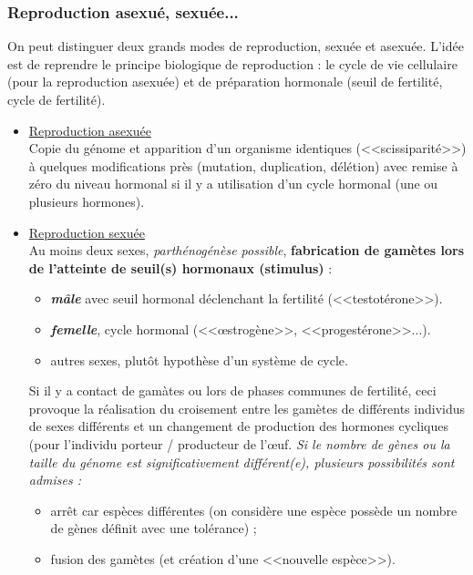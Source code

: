 \documentclass[11pt,twoside,a4paper]{article}
\begin{document}
\clearpage

\subsubsection{Reproduction asexu{\'e}, sexu{\'e}e...}

On peut distinguer deux grands modes de reproduction, sexu{\'e}e et asexu{\'e}e. L'id{\'e}e est de reprendre le principe biologique de reproduction : le cycle de vie cellulaire (pour la reproduction asexu{\'e}e) et de pr{\'e}paration hormonale (seuil de fertilit{\'e}, cycle de fertilit{\'e}).
\begin{itemize}
	\item \underline{Reproduction asexu{\'e}e}~\\
		Copie du g{\'e}nome et apparition d'un organisme identiques (<<scissiparit{\'e}>>) {\`a} quelques modifications pr{\`e}s (mutation, duplication, d{\'e}l{\'e}tion) avec remise {\`a} z{\'e}ro du niveau hormonal si il y a utilisation d'un cycle hormonal (une ou plusieurs hormones). 
	\item \underline{Reproduction sexu{\'e}e}~\\
		Au moins deux sexes, \emph{parth{\'e}nog{\'e}n{\`e}se possible}, \textbf{fabrication de gam{\`e}tes lors de l'atteinte de seuil(s) hormonaux (stimulus)} : 
		\begin{itemize}
			\item \textbf{\textit{m{\^a}le}} avec seuil hormonal d{\'e}clenchant la fertilit{\'e} (<<testot{\'e}rone>>).
			\item \textbf{\textit{femelle}}, cycle hormonal (<<\oe strog{\`e}ne>>, <<progest{\'e}rone>>...). 
			\item autres sexes, plut{\^o}t hypoth{\`e}se d'un syst{\`e}me de cycle. 
		\end{itemize}
		Si il y a contact de gam{\`a}tes ou lors de phases communes de fertilit{\'e}, ceci provoque la r{\'e}alisation du croisement entre les gam{\`e}tes de diff{\'e}rents individus de sexes diff{\'e}rents et un changement de production des hormones cycliques (pour l'individu porteur / producteur de l'\oe uf. \emph{Si le nombre de g{\`e}nes ou la taille du g{\'e}nome est significativement diff{\'e}rent(e), plusieurs possibilit{\'e}s sont admises : }
		\begin{itemize}
			\item arr{\^e}t car esp{\`e}ces diff{\'e}rentes (on consid{\`e}re une esp{\`e}ce poss{\`e}de un nombre de g{\`e}nes d{\'e}finit avec une tol{\'e}rance) ; 
			\item fusion des gam{\`e}tes (et cr{\'e}ation d'une <<nouvelle esp{\`e}ce>>). 

\end{itemize}
\end{itemize}
\end{document}
